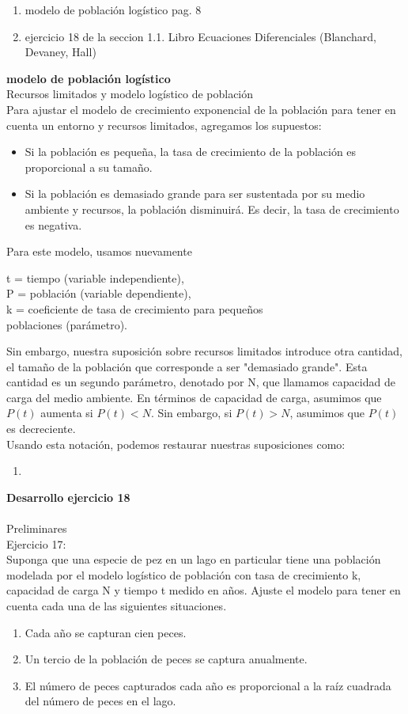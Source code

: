 \documentclass{article}
\begin{document}
\begin{enumerate}
    \item modelo de población logístico pag. 8 
    \item ejercicio 18 de la seccion 1.1. Libro Ecuaciones Diferenciales (Blanchard, Devaney, Hall)
\end{enumerate}
\textbf{modelo de población logístico} \\
Recursos limitados y modelo logístico de población\\
Para ajustar el modelo de crecimiento exponencial de la población para tener en cuenta un entorno y recursos limitados, agregamos los supuestos:
\begin{itemize}
    \item Si la población es pequeña, la tasa de crecimiento de la población es proporcional a su tamaño.
    \item Si la población es demasiado grande para ser sustentada por su medio ambiente y recursos, 
    la población disminuirá. Es decir, la tasa de crecimiento es negativa.
\end{itemize}
Para este modelo, usamos nuevamente
\begin{center}
    t = tiempo (variable independiente),\\
    P = población (variable dependiente),\\
    k = coeficiente de tasa de crecimiento para pequeños\\
    poblaciones (parámetro).
\end{center}
Sin embargo, nuestra suposición sobre recursos limitados introduce otra cantidad, 
el tamaño de la población que corresponde a ser "demasiado grande". Esta cantidad es un segundo 
parámetro, denotado por N, que llamamos capacidad de carga del medio ambiente. En términos de capacidad 
de carga, 
asumimos que $P (t)$ aumenta si $P(t) <N$. Sin embargo, si $P (t)> N$, asumimos que $P (t)$ 
es decreciente. \\ 
Usando esta notación, podemos restaurar nuestras suposiciones como:
\begin{enumerate}
    \item 
\end{enumerate}

\textbf{Desarrollo ejercicio 18}\\ 
\\ 
Preliminares \\ 
Ejercicio 17: \\ 
Suponga que una especie de pez en un lago en particular tiene una población modelada por el modelo logístico de población con tasa de crecimiento k, capacidad de carga N y tiempo t medido en años. Ajuste el modelo para tener en cuenta cada una de las siguientes situaciones.
\begin{enumerate}
    \item Cada año se capturan cien peces.
    \item Un tercio de la población de peces se captura anualmente.
    \item El número de peces capturados cada año es proporcional a la raíz cuadrada del número de peces en el lago.   
\end{enumerate}
\end{document}
